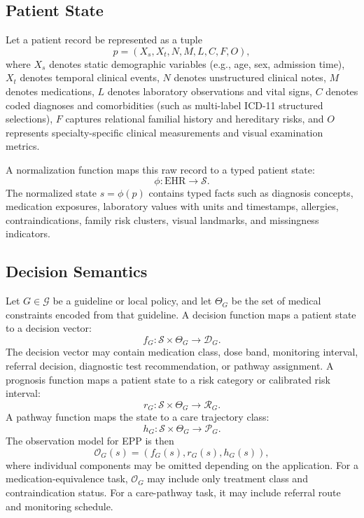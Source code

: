 \documentclass[english,5p,twocolumn,preprint]{elsarticle}
\newcommand{\EHR}{\mathrm{EHR}}
\newcommand{\Guides}{\mathcal{G}}
\newcommand{\Dec}{\mathcal{D}}
\newcommand{\Obs}{\mathcal{O}}
\newcommand{\Risk}{\mathcal{R}}
\newcommand{\Path}{\mathcal{P}}
\newcommand{\State}{\mathcal{S}}
\begin{document}
\subsection{Patient State}
Let a patient record be represented as a tuple
\begin{equation}
    p = (X_s, X_t, N, M, L, C, F, O),
\end{equation}
where $X_s$ denotes static demographic variables (e.g., age, sex, admission time), $X_t$ denotes temporal clinical events, $N$ denotes unstructured clinical notes, $M$ denotes medications, $L$ denotes laboratory observations and vital signs, $C$ denotes coded diagnoses and comorbidities (such as multi-label ICD-11 structured selections), $F$ captures relational familial history and hereditary risks, and $O$ represents specialty-specific clinical measurements and visual examination metrics.

A normalization function maps this raw record to a typed patient state:
\begin{equation}
    \phi : \EHR \rightarrow \State.
\end{equation}
The normalized state $s=\phi(p)$ contains typed facts such as diagnosis concepts, medication exposures, laboratory values with units and timestamps, allergies, contraindications, family risk clusters, visual landmarks, and missingness indicators.

\subsection{Decision Semantics}
Let $G \in \Guides$ be a guideline or local policy, and let $\Theta_G$ be the set of medical constraints encoded from that guideline. A decision function maps a patient state to a decision vector:
\begin{equation}
    f_G : \State \times \Theta_G \rightarrow \Dec_G.
\end{equation}
The decision vector may contain medication class, dose band, monitoring interval, referral decision, diagnostic test recommendation, or pathway assignment. A prognosis function maps a patient state to a risk category or calibrated risk interval:
\begin{equation}
    r_G : \State \times \Theta_G \rightarrow \Risk_G.
\end{equation}
A pathway function maps the state to a care trajectory class:
\begin{equation}
    h_G : \State \times \Theta_G \rightarrow \Path_G.
\end{equation}
The observation model for EPP is then
\begin{equation}
    \Obs_G(s) = \left(f_G(s), r_G(s), h_G(s)\right),
\end{equation}
where individual components may be omitted depending on the application. For a medication-equivalence task, $\Obs_G$ may include only treatment class and contraindication status. For a care-pathway task, it may include referral route and monitoring schedule.
\end{document}
